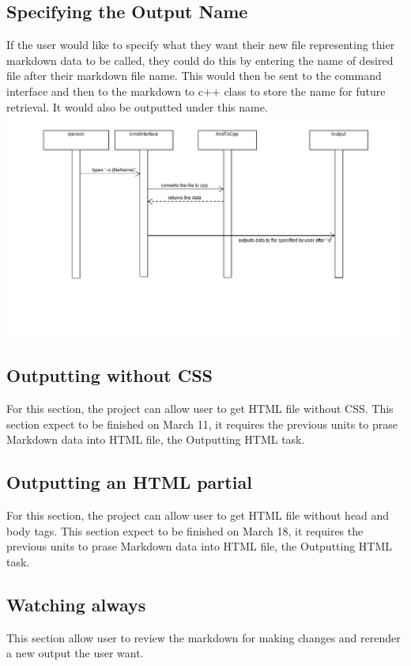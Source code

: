 \subsection{Specifying the Output Name}
If the user would like to specify what they want their new file representing thier markdown data to be called, they could do this by entering the name of desired file after their markdown file name. This would then be sent to the command interface and then to the markdown to c++ class to store the name for future retrieval. It would also be outputted under this name.
\hspace{-3cm}\includegraphics[width=500pt]{images/SpecifyingOutputName.png}

\subsection{Outputting without CSS}
For this section, the project can allow user to get HTML file without CSS. This section expect to be finished on March 11, it requires the previous units to prase Markdown data into HTML file, the Outputting HTML task.

\subsection{Outputting an HTML partial}
For this section, the project can allow user to get HTML file without head and body tags. This section expect to be finished on March 18, it requires the previous units to prase Markdown data into HTML file, the Outputting HTML task.

\subsection{Watching always}
This section allow user to review the markdown for making changes and rerender a new output the user want.
